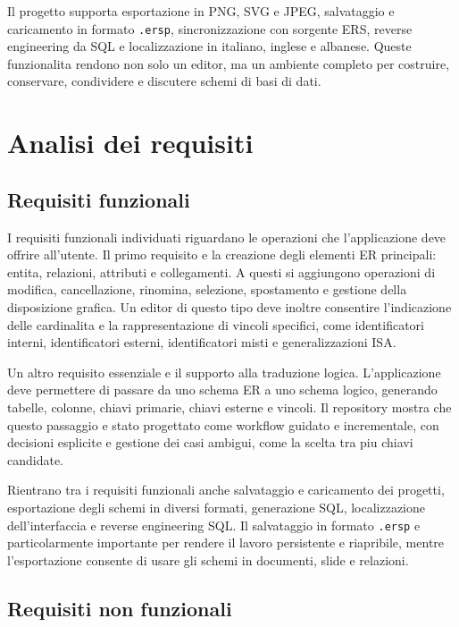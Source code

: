 Il progetto supporta esportazione in PNG, SVG e JPEG, salvataggio e caricamento in formato \texttt{.ersp}, sincronizzazione con sorgente ERS, reverse engineering da SQL e localizzazione in italiano, inglese e albanese. Queste funzionalita rendono \builder{} non solo un editor, ma un ambiente completo per costruire, conservare, condividere e discutere schemi di basi di dati.

\section{Analisi dei requisiti}

\subsection{Requisiti funzionali}

I requisiti funzionali individuati riguardano le operazioni che l'applicazione deve offrire all'utente. Il primo requisito e la creazione degli elementi ER principali: entita, relazioni, attributi e collegamenti. A questi si aggiungono operazioni di modifica, cancellazione, rinomina, selezione, spostamento e gestione della disposizione grafica. Un editor di questo tipo deve inoltre consentire l'indicazione delle cardinalita e la rappresentazione di vincoli specifici, come identificatori interni, identificatori esterni, identificatori misti e generalizzazioni ISA.

Un altro requisito essenziale e il supporto alla traduzione logica. L'applicazione deve permettere di passare da uno schema ER a uno schema logico, generando tabelle, colonne, chiavi primarie, chiavi esterne e vincoli. Il repository mostra che questo passaggio e stato progettato come workflow guidato e incrementale, con decisioni esplicite e gestione dei casi ambigui, come la scelta tra piu chiavi candidate.

Rientrano tra i requisiti funzionali anche salvataggio e caricamento dei progetti, esportazione degli schemi in diversi formati, generazione SQL, localizzazione dell'interfaccia e reverse engineering SQL. Il salvataggio in formato \texttt{.ersp} e particolarmente importante per rendere il lavoro persistente e riapribile, mentre l'esportazione consente di usare gli schemi in documenti, slide e relazioni.

\subsection{Requisiti non funzionali}

